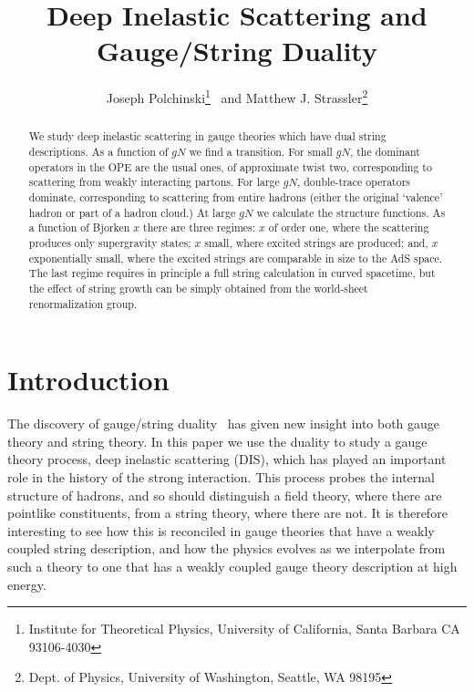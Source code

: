 \title{Deep Inelastic Scattering and Gauge/String Duality}
\author{Joseph Polchinski\thanks{Institute for Theoretical Physics,
University of California, Santa Barbara CA 93106-4030}  \ and
Matthew J. Strassler\thanks{Dept. of Physics,
University of Washington, Seattle, WA 98195}}
\maketitle
\begin{abstract} We study deep inelastic scattering in gauge theories which have dual string 
descriptions.  As a function of $gN$ we find a transition.  For small
$gN$, the dominant operators in the OPE are the usual ones, of
approximate twist two, corresponding to scattering from weakly
interacting partons.  For large $gN$, double-trace operators dominate,
corresponding to scattering from entire hadrons (either the original
`valence' hadron or part of a hadron cloud.)  At large $gN$ we
calculate the structure functions.  As a function of Bjorken $x$ there
are three regimes: $x$ of order one, where the scattering produces
only supergravity states; $x$ small, where excited strings are
produced; and, $x$ exponentially small, where the excited strings are
comparable in size to the AdS space.  The last regime requires in
principle a full string calculation in curved spacetime, but the
effect of string growth can be simply obtained from the world-sheet
renormalization group.



\end{abstract}

\newpage

\section{Introduction}

The discovery of gauge/string duality~\cite{maldacon} has given new
insight into both gauge theory and string theory.  In this paper we use
the duality to study a gauge theory process, deep inelastic scattering
(DIS), which has played an important role in the history of the strong
interaction.  This process probes the internal structure of hadrons,
and so should distinguish a field theory, where there are pointlike
constituents, from a string theory, where there are not. It is
therefore interesting to see how this is reconciled in gauge theories
that have a weakly coupled string description, and how the physics
evolves as we interpolate from such a theory to one that has a weakly
coupled gauge theory description at high energy.

